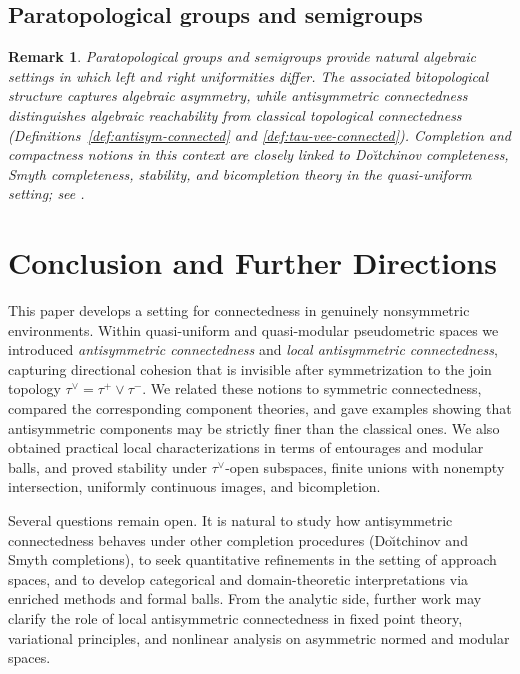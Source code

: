 \documentclass[preprint,12pt]{elsarticle}
\newtheorem{remark}[theorem]{Remark}
\begin{document}

\subsection{Paratopological groups and semigroups}\label{ssec:ex-algebra}

\begin{remark}
\label{rem:ex-paratopo}
Paratopological groups and semigroups provide natural algebraic settings
in which left and right uniformities differ. The associated bitopological
structure captures algebraic asymmetry, while antisymmetric
connectedness distinguishes algebraic reachability from classical
topological connectedness (Definitions~\ref{def:antisym-connected} and
\ref{def:tau-vee-connected}). Completion and compactness notions in
this context are closely linked to Do\u{\i}tchinov completeness, Smyth
completeness, stability, and bicompletion theory in the quasi-uniform
setting; see
\cite{Kunzi2001,KunziJunnila1993,KunziRomagueraSipacheva1998}.
\end{remark}


\section{Conclusion and Further Directions}\label{sec:conclusion}

This paper develops a setting for connectedness in genuinely
nonsymmetric environments. Within quasi-uniform and quasi-modular
pseudometric spaces we introduced \emph{antisymmetric connectedness} and
\emph{local antisymmetric connectedness}, capturing directional cohesion
that is invisible after symmetrization to the join topology
$\tau^{\vee}=\tau^{+}\vee\tau^{-}$. We related these notions to symmetric
connectedness, compared the corresponding component theories, and gave
examples showing that antisymmetric components may be strictly finer
than the classical ones. We also obtained practical local
characterizations in terms of entourages and modular balls, and proved
stability under $\tau^{\vee}$-open subspaces, finite unions with
nonempty intersection, uniformly continuous images, and bicompletion.

Several questions remain open. It is natural to study how antisymmetric
connectedness behaves under other completion procedures (Do\u{\i}tchinov
and Smyth completions), to seek quantitative refinements in the setting
of approach spaces, and to develop categorical and domain-theoretic
interpretations via enriched methods and formal balls. From the analytic
side, further work may clarify the role of local antisymmetric
connectedness in fixed point theory, variational principles, and
nonlinear analysis on asymmetric normed and modular spaces.
\end{document}
